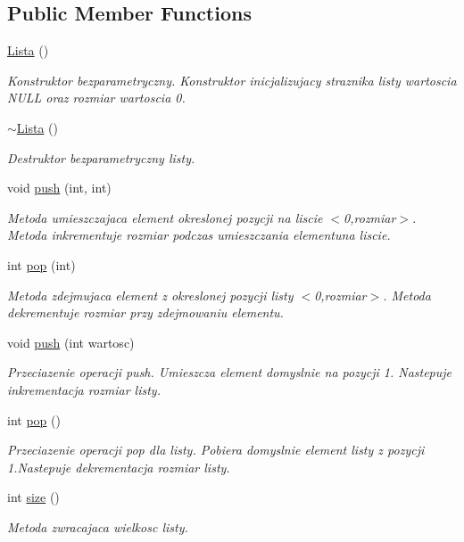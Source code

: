 \subsection*{Public Member Functions}
\begin{DoxyCompactItemize}
\item 
\hyperlink{a00014_a1f668b36909182ef1360b48503529a31}{Lista} ()
\begin{DoxyCompactList}\small\item\em Konstruktor bezparametryczny. Konstruktor inicjalizujacy straznika listy wartoscia N\+U\+L\+L oraz rozmiar wartoscia 0. \end{DoxyCompactList}\item 
\hyperlink{a00014_a4d7394b2728a00ad8404965b2e15d096}{$\sim$\+Lista} ()
\begin{DoxyCompactList}\small\item\em Destruktor bezparametryczny listy. \end{DoxyCompactList}\item 
void \hyperlink{a00014_af13f329882aeacf6dd1ad28b014f2c41}{push} (int, int)
\begin{DoxyCompactList}\small\item\em Metoda umieszczajaca element okreslonej pozycji na liscie $<$0,rozmiar$>$. Metoda inkrementuje rozmiar podczas umieszczania elementuna liscie. \end{DoxyCompactList}\item 
int \hyperlink{a00014_acaf8411473b2118c8f54272a58aae14d}{pop} (int)
\begin{DoxyCompactList}\small\item\em Metoda zdejmujaca element z okreslonej pozycji listy $<$0,rozmiar$>$. Metoda dekrementuje rozmiar przy zdejmowaniu elementu. \end{DoxyCompactList}\item 
void \hyperlink{a00014_a4e00c7aa7ab1918d4f282f610f47a164}{push} (int wartosc)
\begin{DoxyCompactList}\small\item\em Przeciazenie operacji push. Umieszcza element domyslnie na pozycji 1. Nastepuje inkrementacja rozmiar listy. \end{DoxyCompactList}\item 
int \hyperlink{a00014_ad4905f890e73715d783a197a51aee985}{pop} ()
\begin{DoxyCompactList}\small\item\em Przeciazenie operacji pop dla listy. Pobiera domyslnie element listy z pozycji 1.\+Nastepuje dekrementacja rozmiar listy. \end{DoxyCompactList}\item 
int \hyperlink{a00014_a3836382e3cf53b6ea281937d045d181c}{size} ()
\begin{DoxyCompactList}\small\item\em Metoda zwracajaca wielkosc listy. \end{DoxyCompactList}\end{DoxyCompactItemize}


